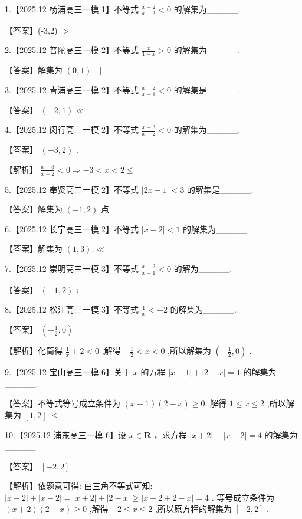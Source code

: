 \documentclass[10pt]{article}
\begin{document}
1.【2025.12 杨浦高三一模 1】不等式 \(\frac{x - 2}{x + 3} < 0\) 的解集为\_\_\_\_\_.

【答案】(-3,2) \(>\)

2.【2025.12 普陀高三一模 2】不等式 \(\frac{x}{1 - x} > 0\) 的解集为\_\_\_\_\_.

【答案】解集为 \(\left( {0,1}\right)  :  \parallel\)

3.【2025.12 青浦高三一模 2】不等式 \(\frac{x + 2}{x - 1} < 0\) 的解集是\_\_\_\_\_.

【答案】 \(\left( {-2,1}\right)  \ll\)

4.【2025.12 闵行高三一模 2】不等式 \(\frac{x + 3}{x - 2} < 0\) 的解集为\_\_\_\_\_.

【答案】 \(\left( {-3,2}\right)\) .

【解析】 \(\frac{x + 3}{x - 2} < 0 \Rightarrow   - 3 < x < 2 \leq\)

5.【2025.12 奉贤高三一模 2】不等式 \(\left| {{2x} - 1}\right|  < 3\) 的解集是\_\_\_\_\_.

【答案】解集为 \(\left( {-1,2}\right)\) 点

6.【2025.12 长宁高三一模 2】不等式 \(\left| {x - 2}\right|  < 1\) 的解集为\_\_\_\_\_.

【答案】解集为 \(\left( {1,3}\right) . \ll\)

7.【2025.12 崇明高三一模 3】不等式 \(\frac{x - 2}{x + 1} < 0\) 的解为\_\_\_\_\_.

【答案】 \(\left( {-1,2}\right)  \leftarrow\)

8.【2025.12 松江高三一模 3】不等式 \(\frac{1}{x} <  - 2\) 的解集为\_\_\_\_\_.

【答案】 \(\left( {-\frac{1}{2},0}\right)\)

【解析】化简得 \(\frac{1}{x} + 2 < 0\) ,解得 \(- \frac{1}{2} < x < 0\) ,所以解集为 \(\left( {-\frac{1}{2},0}\right)\) .

9.【2025.12 宝山高三一模 6】关于 \(x\) 的方程 \(\left| {x - 1}\right|  + \left| {2 - x}\right|  = 1\) 的解集为\_\_\_\_\_.

【答案】不等式等号成立条件为 \(\left( {x - 1}\right) \left( {2 - x}\right)  \geq  0\) ,解得 \(1 \leq  x \leq  2\) ,所以解集为 \(\left\lbrack  {1,2}\right\rbrack   \cdot   \leq\)

10.【2025.12 浦东高三一模 6】设 \(x \in  \mathbf{R}\) ，求方程 \(\left| {x + 2}\right|  + \left| {x - 2}\right|  = 4\) 的解集为\_\_\_\_\_.

【答案】 \(\left\lbrack  {-2,2}\right\rbrack\)

【解析】依题意可得: 由三角不等式可知: \(\left| {x + 2}\right|  + \left| {x - 2}\right|  = \left| {x + 2}\right|  + \left| {2 - x}\right|  \geq  \left| {x + 2 + 2 - x}\right|  = 4\) . 等号成立条件为 \(\left( {x + 2}\right) \left( {2 - x}\right)  \geq  0\) ,解得 \(- 2 \leq  x \leq  2\) ,所以原方程的解集为 \(\left\lbrack  {-2,2}\right\rbrack\) .
\end{document}
